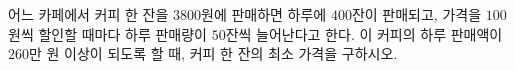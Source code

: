 어느 카페에서 커피 한 잔을 $3800$원에 판매하면 하루에 $400$잔이 판매되고, 가격을 $100$원씩 할인할 때마다 하루 판매량이 $50$잔씩 늘어난다고 한다. 이 커피의 하루 판매액이 $260$만 원 이상이 되도록 할 때, 커피 한 잔의 최소 가격을 구하시오.
